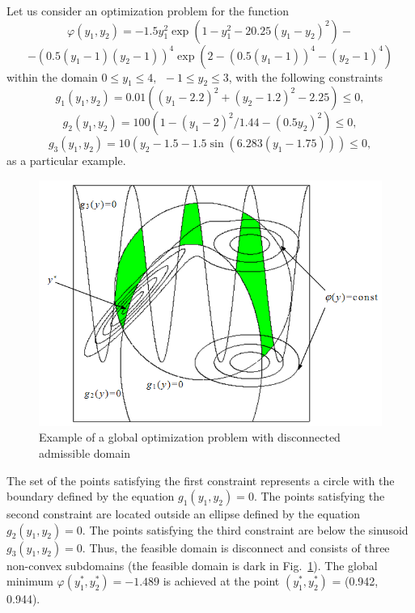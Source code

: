 Let us consider an optimization problem  for the function
\begin{displaymath}
\varphi(y_1,y_2)=-1.5y_1^2\exp(1-y_1^2-20.25(y_1-y_2)^2)-
\end{displaymath}
\begin{displaymath}
-(0.5(y_1-1)(y_2-1))^4\exp(2-(0.5(y_1-1))^4-(y_2-1)^4)
\end{displaymath}
within the domain $0 \leq y_1\leq 4,\ \  -1\leq y_2\leq 3$, with the following constraints 
\begin{displaymath}
g_1(y_1,y_2)=0.01((y_1-2.2)^2+(y_2-1.2)^2-2.25)\leq 0,
\end{displaymath}
\begin{displaymath}
g_2(y_1,y_2)=100(1-(y_1-2)^2/1.44-(0.5y_2)^2)\leq 0,
\end{displaymath}
\begin{displaymath}
g_3(y_1,y_2)=10(y_2-1.5-1.5\sin(6.283(y_1-1.75)))\leq 0,
\end{displaymath}
as a particular example.

\begin{figure}[t]
\includegraphics[width=0.7\linewidth]{figures/figure1_1.png}
\caption{Example of a global optimization problem with disconnected admissible domain}
\label{1_fig_1}    
\end{figure}

The set of the points satisfying the first constraint represents a circle with the boundary defined by the equation $g_1(y_1,y_2)=0$. The points satisfying the second constraint are located outside an ellipse defined by the equation $g_2(y_1,y_2)=0$. The points satisfying the third constraint are below the sinusoid $g_3(y_1,y_2)=0$. Thus, the feasible domain is disconnect and consists of three non-convex subdomains (the feasible domain is dark in Fig.~\ref{1_fig_1}). The global minimum $\varphi(y_1^*,y_2^*)=-1.489$  is achieved at the point $(y_1^*,y_2^*)$  = (0.942, 0.944).

